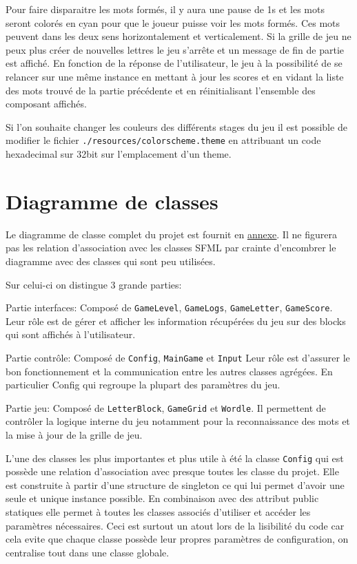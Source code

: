 \documentclass[11pt, openright]{book}
\begin{document}
            Pour faire disparaitre les mots formés, il y aura une pause de 1s et les mots seront colorés en cyan pour que le joueur puisse voir les mots formés. Ces mots peuvent dans les deux sens horizontalement et verticalement. Si la grille de jeu ne peux plus créer de nouvelles lettres le jeu s'arrête et un message de fin de partie est affiché. En fonction de la réponse de l'utilisateur, le jeu à la possibilité de se relancer sur une même instance en mettant à jour les scores et en vidant la liste des mots trouvé de la partie précédente et en réinitialisant l'ensemble des composant affichés.

            Si l'on souhaite changer les couleurs des différents stages du jeu il est possible de modifier le fichier \texttt{./resources/colorscheme.theme} en attribuant un code hexadecimal sur 32bit sur l'emplacement d'un theme.


    \newpage

    \section{Diagramme de classes}
    
    Le diagramme de classe complet du projet est fournit en \hyperref[sec::annexe]{\ul{annexe}}. Il ne figurera pas les relation d'association avec les classes SFML par crainte d'encombrer le diagramme avec des classes qui sont peu utilisées.

    Sur celui-ci on distingue 3 grande parties:
     \begin{items}{-15pt}{-15pt}
        \item Partie interfaces: Composé de \texttt{GameLevel}, \texttt{GameLogs}, \texttt{GameLetter}, \texttt{GameScore}. Leur rôle est de gérer et afficher les information récupérées du jeu sur des blocks qui sont affichés à l'utilisateur.
        \item Partie contrôle:  Composé de \texttt{Config}, \texttt{MainGame} et \texttt{Input} Leur rôle est d'assurer le bon fonctionnement et la communication entre les autres classes agrégées. En particulier Config qui regroupe la plupart des paramètres du jeu.
        \item Partie jeu: Composé de \texttt{LetterBlock}, \texttt{GameGrid} et \texttt{Wordle}. Il permettent de contrôler la logique interne du jeu notamment pour la reconnaissance des mots et la mise à jour de la grille de jeu. 
    \end{items}

    L'une des classes les plus importantes et plus utile à été la classe \texttt{Config} qui est possède une relation d'association avec presque toutes les classe du projet. Elle est construite à partir d'une structure de singleton ce qui lui permet d'avoir une seule et unique instance possible. En combinaison avec des attribut public statiques elle permet à toutes les classes associés d'utiliser et accéder les paramètres nécessaires. Ceci est surtout un atout lors de la lisibilité du code car cela evite que chaque classe possède leur propres paramètres de configuration, on centralise tout dans une classe globale. 
\end{document}
